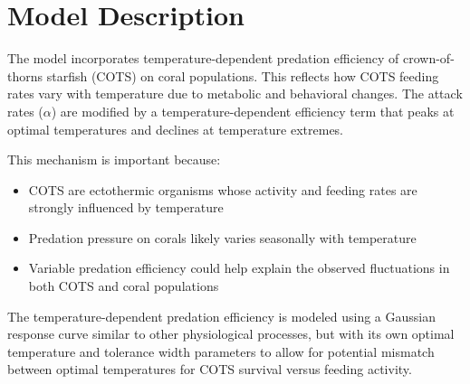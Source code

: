 \section{Model Description}

The model incorporates temperature-dependent predation efficiency of crown-of-thorns starfish (COTS) on coral populations. This reflects how COTS feeding rates vary with temperature due to metabolic and behavioral changes. The attack rates ($\alpha$) are modified by a temperature-dependent efficiency term that peaks at optimal temperatures and declines at temperature extremes.

This mechanism is important because:
\begin{itemize}
\item COTS are ectothermic organisms whose activity and feeding rates are strongly influenced by temperature
\item Predation pressure on corals likely varies seasonally with temperature
\item Variable predation efficiency could help explain the observed fluctuations in both COTS and coral populations
\end{itemize}

The temperature-dependent predation efficiency is modeled using a Gaussian response curve similar to other physiological processes, but with its own optimal temperature and tolerance width parameters to allow for potential mismatch between optimal temperatures for COTS survival versus feeding activity.
